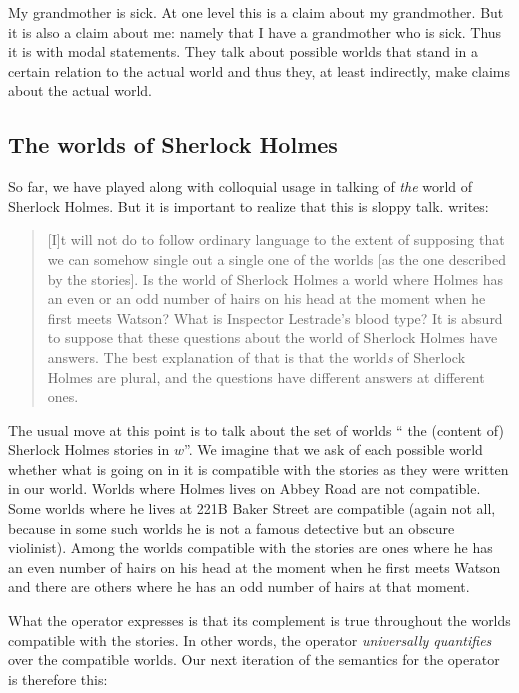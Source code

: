 \ex My grandmother is sick. \xe
%
At one level this is a claim about my grandmother. But it is also a claim about
me: namely that I have a grandmother who is sick. Thus it is with modal
statements. They talk about possible worlds that stand in a certain relation to
the actual world and thus they, at least indirectly, make claims about the
actual world.

\subsection{The worlds of Sherlock Holmes} \label{sec:worlds-sherl-holm}

So far, we have played along with colloquial usage in talking of \emph{the}
world of Sherlock Holmes. But it is important to realize that this is sloppy
talk. \citet{lewis-1978-fiction} writes:

\begin{quote}
  [I]t will not do to follow ordinary language to the extent of supposing that
  we can somehow single out a single one of the worlds [as the one described by
  the stories]. Is the world of Sherlock Holmes a world where Holmes has an even
  or an odd number of hairs on his head at the moment when he first meets
  Watson? What is Inspector Lestrade's blood type? It is absurd to suppose that
  these questions about the world of Sherlock Holmes have answers. The best
  explanation of that is that the world\emph{s} of Sherlock Holmes are plural,
  and the questions have different answers at different ones.
\end{quote}
%
%
The usual move at this point is to talk about the set of worlds
`` the (content of) Sherlock Holmes stories in $w$''. We
imagine that we ask of each possible world whether what is going on in it is
compatible with the stories as they were written in our world. Worlds where
Holmes lives on Abbey Road are not compatible. Some worlds where he lives at
221B Baker Street are compatible (again not all, because in some such worlds he
is not a famous detective but an obscure violinist). Among the worlds compatible
with the stories are ones where he has an even number of hairs on his head at
the moment when he first meets Watson and there are others where he has an odd
number of hairs at that moment.

What the operator  expresses is that
its complement is true throughout the worlds compatible with the stories. In
other words, the operator \emph{universally quantifies} over the compatible
worlds. Our next iteration of the semantics for the operator is therefore this:

